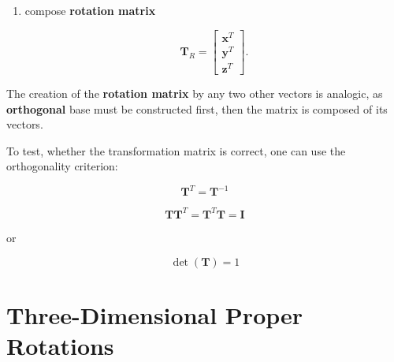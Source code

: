 \begin{enumerate}
\begin{bbox}[0.85]
\begin{enumerate}
                \item compose \textbf{rotation matrix}

                    \begin{equation}
                        \mathbf{T}_{R} = \begin{bmatrix}
                            \mathbf{x}^{T} \\
                            \mathbf{y}^{T} \\
                            \mathbf{z}^{T}
                        \end{bmatrix}
                    .\end{equation}
            \end{enumerate}

            The creation of the \textbf{rotation matrix} by any two other vectors is
            analogic, as \textbf{orthogonal} base must be constructed first, then
            the matrix is composed of its vectors.
        \end{bbox}

        \begin{bbox}[0.85]

            To test, whether the transformation matrix is correct, one can use
            the orthogonality criterion:

            \begin{equation}
                \mathbf{T}^{T} = \mathbf{T}^{-1}
            \end{equation}

            \begin{equation}
                \mathbf{T}\mathbf{T}^{T} = \mathbf{T}^{T}\mathbf{T} = \mathbf{I}
            \end{equation}

            or

            \begin{equation}
                \det(\mathbf{T}) = 1
            \end{equation}

        \end{bbox}

\end{enumerate}



\section{Three-Dimensional Proper Rotations}


